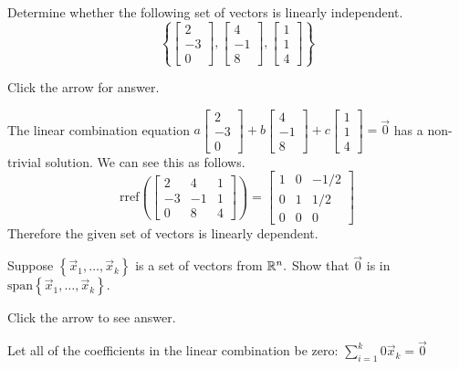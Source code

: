 \documentclass{ximera}
\begin{document}
\begin{problem}\label{prb:solvedCh2_2}
Determine whether the following set of vectors is linearly independent.
$$\left\{\begin{bmatrix}
    2\\ -3\\0
\end{bmatrix}, \begin{bmatrix}
    4\\-1\\8
\end{bmatrix}, \begin{bmatrix}
    1\\1\\4
\end{bmatrix}\right\}$$

Click the arrow for answer.

\begin{expandable}{}{}
    The linear combination equation $a\begin{bmatrix}
    2\\ -3\\0
\end{bmatrix}+ b\begin{bmatrix}
    4\\-1\\8
\end{bmatrix}+ c\begin{bmatrix}
    1\\1\\4
\end{bmatrix}=\vec{0}$ has a non-trivial solution.  We can see this as follows.
$$\text{rref}\left(\begin{bmatrix}2 & 4 & 1\\-3 & -1 & 1\\0 & 8 & 4\end{bmatrix}\right)=\begin{bmatrix}
    1 & 0 & -1/2\\0 & 1 &1/2\\ 0 & 0 &0
\end{bmatrix}$$
Therefore the given set of vectors is linearly dependent.
\end{expandable}
\end{problem}

\begin{problem}\label{prb:3.14} Suppose $\left\{ \vec{x}_{1},\ldots ,\vec{x}_{k}\right\} $ is a
set of vectors from $\mathbb{R}^{n}.$ Show that $\vec{0}$ is in $\mbox{
span}\left\{ \vec{x}_{1},\ldots ,\vec{x}_{k}\right\} .$

Click the arrow to see answer.
\begin{expandable}{}{}
Let all of the coefficients in the linear combination be zero: 
 $\sum_{i=1}^{k}0\vec{x}_{k}=\vec{0}$
\end{expandable}
\end{problem}
\end{document}
